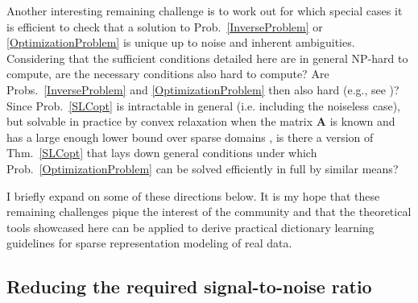 Another interesting remaining challenge is to work out for which special cases it is efficient to check that a solution to Prob.~\ref{InverseProblem} or \ref{OptimizationProblem} is unique up to noise and inherent ambiguities. Considering that the sufficient conditions detailed here are in general NP-hard to compute, are the necessary conditions also hard to compute? Are Probs.~\ref{InverseProblem} and \ref{OptimizationProblem} then also hard (e.g., see \cite{tillmann2015computational})? Since Prob.~\ref{SLCopt} is intractable in general (i.e. including the noiseless case), but solvable in practice by convex relaxation when the matrix $\mathbf{A}$ is known and has a large enough lower bound over sparse domains \cite{eldar2012compressed}, is there a version of Thm.~\ref{SLCopt} that lays down general conditions under which Prob.~\ref{OptimizationProblem} can be solved efficiently in full by similar means?  %



I briefly expand on some of these directions below. It is my hope that these remaining challenges pique the interest of the community and that the theoretical tools showcased here can be applied to derive practical dictionary learning guidelines for sparse representation modeling of real data. 


\subsection{Reducing the required signal-to-noise ratio}

